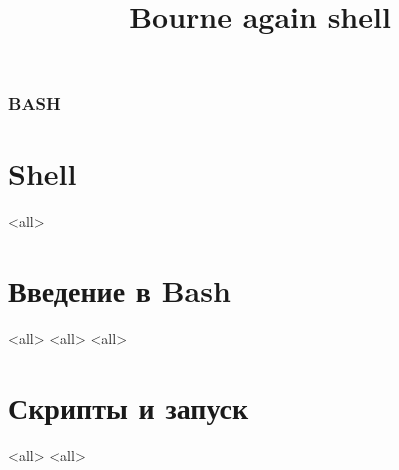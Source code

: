 
\title[bash]{Bourne again shell}




\begin{frame}
	\frametitle{BASH}
	\titlepage
	\vspace{-0.5cm}
	\begin{center}
	\end{center}
\end{frame}

\begin{frame}
	\tableofcontents
\end{frame}




\section{Shell}
\mode<all>{}

\section[Bash intro]{Введение в Bash}
\mode<all>{}
\mode<all>{}
\mode<all>{}

\section[Runtime]{Скрипты и запуск}

\mode<all>{}
\mode<all>{}


